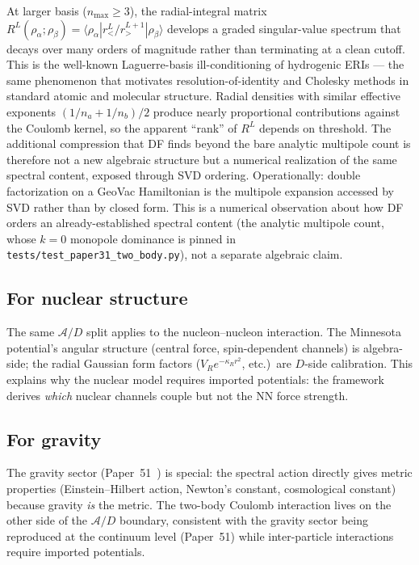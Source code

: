 \documentclass[twocolumn,pra,amsmath,amssymb,superscriptaddress]{revtex4-2}
\begin{document}
At larger basis ($n_{\max} \geq 3$), the radial-integral matrix
$R^L(\rho_\alpha; \rho_\beta) = \langle\rho_\alpha|r_<^L/r_>^{L+1}|
\rho_\beta\rangle$ develops a graded singular-value spectrum that
decays over many orders of magnitude rather than terminating at a
clean cutoff. This is the well-known
Laguerre-basis ill-conditioning of hydrogenic ERIs --- the same
phenomenon that motivates resolution-of-identity and Cholesky
methods in standard atomic and molecular structure. Radial densities
with similar effective exponents $(1/n_a + 1/n_b)/2$ produce nearly
proportional contributions against the Coulomb kernel, so the
apparent ``rank'' of $R^L$ depends on threshold. The additional compression that DF finds beyond the bare
analytic multipole count is therefore not a new algebraic structure
but a numerical realization of the same spectral content, exposed
through SVD ordering. Operationally: double factorization on a
GeoVac Hamiltonian is the multipole expansion accessed by SVD rather
than by closed form. This is a numerical observation about how DF
orders an already-established spectral content (the analytic multipole
count, whose $k=0$ monopole dominance is pinned in
\texttt{tests/test\_paper31\_two\_body.py}), not a separate algebraic
claim.

\subsection{For nuclear structure}

The same $\mathcal{A}/D$ split applies to the nucleon--nucleon
interaction. The Minnesota potential's angular structure (central
force, spin-dependent channels) is algebra-side; the radial Gaussian
form factors ($V_R e^{-\kappa_R r^2}$, etc.)\ are $D$-side
calibration. This explains why the nuclear model requires imported
potentials: the framework derives \emph{which} nuclear channels couple
but not the NN force strength.

\subsection{For gravity}

The gravity sector (Paper~51~\cite{paper51}) is special: the spectral
action directly gives metric properties (Einstein--Hilbert action,
Newton's constant, cosmological constant) because gravity \emph{is}
the metric. The two-body Coulomb interaction lives on the other side
of the $\mathcal{A}/D$ boundary, consistent with the gravity sector
being reproduced at the continuum level (Paper~51) while
inter-particle interactions require imported potentials.
\end{document}
